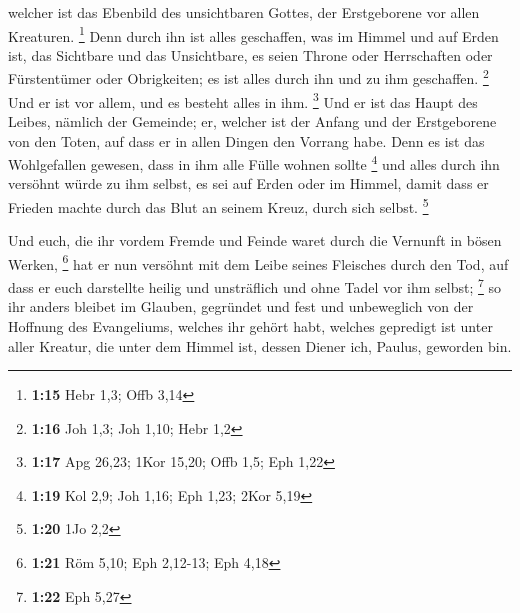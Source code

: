  welcher ist das Ebenbild des unsichtbaren Gottes, der
Erstgeborene vor allen Kreaturen. \footnote{\textbf{1:15} Hebr 1,3; Offb
  3,14}  Denn durch ihn ist alles geschaffen, was im
Himmel und auf Erden ist, das Sichtbare und das Unsichtbare, es seien
Throne oder Herrschaften oder Fürstentümer oder Obrigkeiten; es ist
alles durch ihn und zu ihm geschaffen. \footnote{\textbf{1:16} Joh 1,3;
  Joh 1,10; Hebr 1,2}  Und er ist vor allem, und es
besteht alles in ihm. \footnote{\textbf{1:17} Apg 26,23; 1Kor 15,20;
  Offb 1,5; Eph 1,22}  Und er ist das Haupt des Leibes,
nämlich der Gemeinde; er, welcher ist der Anfang und der Erstgeborene
von den Toten, auf dass er in allen Dingen den Vorrang habe.
 Denn es ist das Wohlgefallen gewesen, dass in ihm alle
Fülle wohnen sollte \footnote{\textbf{1:19} Kol 2,9; Joh 1,16; Eph 1,23;
  2Kor 5,19}  und alles durch ihn versöhnt würde zu ihm
selbst, es sei auf Erden oder im Himmel, damit dass er Frieden machte
durch das Blut an seinem Kreuz, durch sich selbst. \footnote{\textbf{1:20}
  1Jo 2,2}

 Und euch, die ihr vordem Fremde und Feinde waret durch
die Vernunft in bösen Werken, \footnote{\textbf{1:21} Röm 5,10; Eph
  2,12-13; Eph 4,18}  hat er nun versöhnt mit dem Leibe
seines Fleisches durch den Tod, auf dass er euch darstellte heilig und
unsträflich und ohne Tadel vor ihm selbst; \footnote{\textbf{1:22} Eph
  5,27}  so ihr anders bleibet im Glauben, gegründet und
fest und unbeweglich von der Hoffnung des Evangeliums, welches ihr
gehört habt, welches gepredigt ist unter aller Kreatur, die unter dem
Himmel ist, dessen Diener ich, Paulus, geworden bin.

